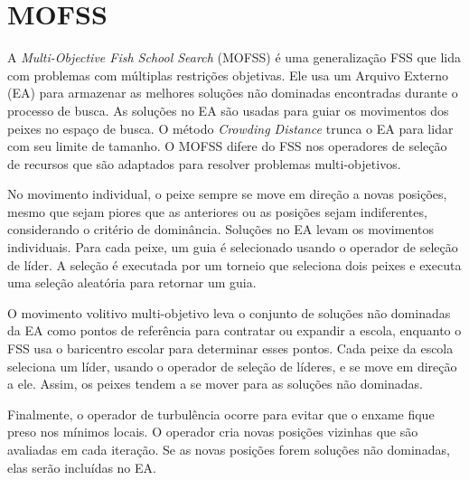 \section{MOFSS}
\label{sec-mofss}

A \textit{Multi-Objective Fish School Search} (MOFSS) é uma generalização FSS que lida com problemas com múltiplas restrições objetivas. Ele usa um Arquivo Externo (EA) para armazenar as melhores soluções não dominadas encontradas durante o processo de busca. As soluções no EA são usadas para guiar os movimentos dos peixes no espaço de busca. O método \textit{Crowding Distance} trunca o EA para lidar com seu limite de tamanho. O MOFSS difere do FSS nos operadores de seleção de recursos que são adaptados para resolver problemas multi-objetivos.

No movimento individual, o peixe sempre se move em direção a novas posições, mesmo que sejam piores que as anteriores ou as posições sejam indiferentes, considerando o critério de dominância. Soluções no EA levam os movimentos individuais. Para cada peixe, um guia é selecionado usando o operador de seleção de líder. A seleção é executada por um torneio que seleciona dois peixes e executa uma seleção aleatória para retornar um guia.

O movimento volitivo multi-objetivo leva o conjunto de soluções não dominadas da EA como pontos de referência para contratar ou expandir a escola, enquanto o FSS usa o baricentro escolar para determinar esses pontos. Cada peixe da escola seleciona um líder, usando o operador de seleção de líderes, e se move em direção a ele. Assim, os peixes tendem a se mover para as soluções não dominadas.

Finalmente, o operador de turbulência ocorre para evitar que o enxame fique preso nos mínimos locais. O operador cria novas posições vizinhas que são avaliadas em cada iteração. Se as novas posições forem soluções não dominadas, elas serão incluídas no EA.
